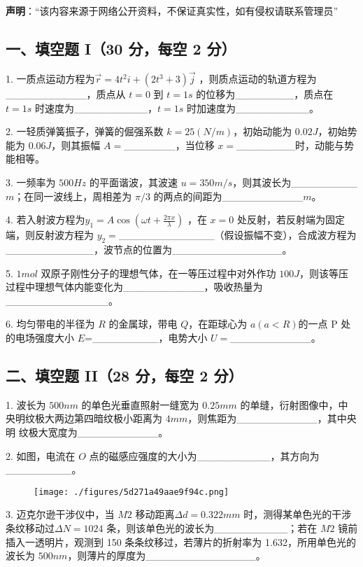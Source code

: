 
\textbf{声明}：“该内容来源于网络公开资料，不保证真实性，如有侵权请联系管理员”

\subsection{一、填空题 I（30 分，每空 2 分）}
1. 一质点运动方程为$\vec{r}=4t^2i+(2t^3+3)\vec{j}$ ，则质点运动的轨道方程为___________，质点从 $t=0$ 到 $t=1s$ 的位移为________，质点在 $t=1s$ 时速度为__________，$t=1s$ 时加速度为__________。

2. 一轻质弹簧振子，弹簧的倔强系数 $k=25(N/m)$，初始动能为 $0.02J$，初始势能为 $0.06J$，则其振幅 $A=$_______，当位移 $x=$________时，动能与势能相等。

3. 一频率为 $500Hz$ 的平面谐波，其波速 $u=350m/s$，则其波长为_________$m$；在同一波线上，周相差为 $\pi/3$ 的两点的间距为___________$m$。

4. 若入射波方程为$y_1=A\cos(\omega t+\frac{2\pi x}{\lambda})$ ，在 $x=0$ 处反射，若反射端为固定端，则反射波方程为 $y_2=$_____________（假设振幅不变），合成波方程为____________，波节点的位置为_______________。

5. $1mol$ 双原子刚性分子的理想气体，在一等压过程中对外作功 $100J$，则该等压
过程中理想气体内能变化为___________，吸收热量为______________。

6. 均匀带电的半径为 $R$ 的金属球，带电 $Q$，在距球心为 $a(a<R)$的一点 P 处
的电场强度大小 $E$=_________，电势大小 $U=$___________。
\subsection{二、填空题 II（28 分，每空 2 分）}
1. 波长为 $500nm$ 的单色光垂直照射一缝宽为 $0.25mm$ 的单缝，衍射图像中，中
央明纹极大两边第四暗纹极小距离为 $4mm$，则焦距为___________，其中央明
纹极大宽度为___________。

2. 如图，电流在 $O$ 点的磁感应强度的大小为__________，其方向为_________。
\begin{figure}[ht]
\centering
\texttt{[image: ./figures/5d271a49aae9f94c.png]}
\caption{} \label{fig_NJUB07_1}
\end{figure}
3. 迈克尔逊干涉仪中，当 $M2$ 移动距离$\Delta d=0.322mm$ 时，测得某单色光的干涉条纹移动过$\Delta N=1024$ 条，则该单色光的波长为__________；若在 $M2$ 镜前插入一透明片，观测到 150 条条纹移过，若薄片的折射率为 1.632，所用单色光的波长为 $500nm$，则薄片的厚度为_______________。

